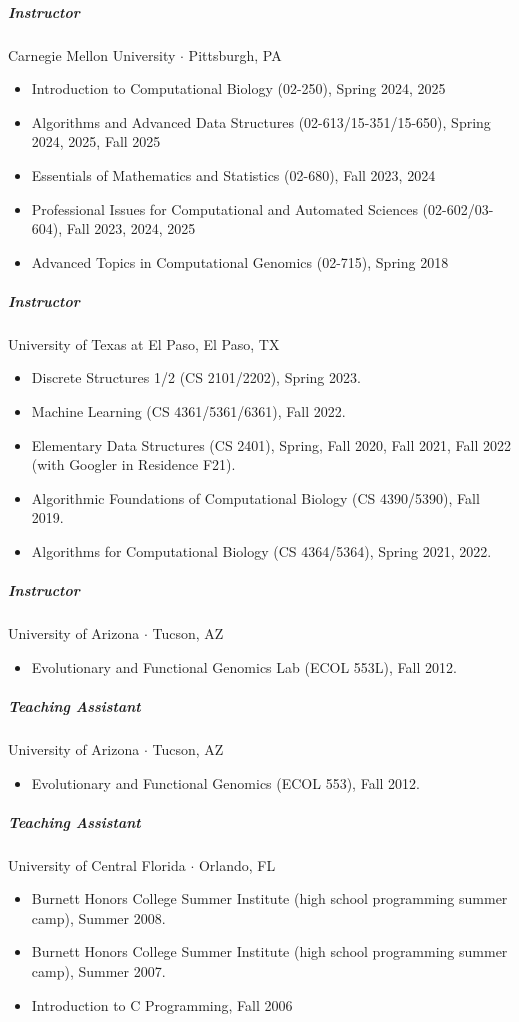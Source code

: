 \documentclass[10pt,letterpaper]{article}
\newcommand{\bigdot}{$\cdot$\xspace}
\begin{document}
\subparagraph{Instructor}  Carnegie Mellon University \bigdot Pittsburgh, PA
\begin{itemize}
    \item Introduction to Computational Biology (02-250), Spring 2024, 2025
    \item Algorithms and Advanced Data Structures (02-613/15-351/15-650), Spring 2024\footnotemark[1], 2025, Fall 2025
    \item Essentials of Mathematics and Statistics (02-680), Fall 2023\footnotemark[1], 2024
    \item Professional Issues for Computational and Automated Sciences (02-602/03-604), Fall 2023\footnotemark[1], 2024\footnotemark[1], 2025\footnotemark[1]
    \item Advanced Topics in Computational Genomics (02-715), Spring 2018\footnotemark[1]
 \end{itemize}

\subparagraph{Instructor}  University of Texas at El Paso, El Paso, TX
\begin{itemize}
	\item Discrete Structures 1/2 (CS 2101/2202), Spring 2023.
	\item Machine Learning (CS 4361/5361/6361), Fall 2022.
	\item Elementary Data Structures (CS 2401), Spring, Fall 2020, Fall 2021, Fall 2022 (with Googler in Residence F21).
	\item Algorithmic Foundations of Computational Biology (CS 4390/5390), Fall 2019.
	\item Algorithms for Computational Biology (CS 4364/5364), Spring 2021, 2022.
\end{itemize}


\subparagraph{Instructor} University of Arizona \bigdot Tucson, AZ
\begin{itemize}
    \item Evolutionary and Functional Genomics Lab (ECOL 553L), Fall 2012.
\end{itemize}

\subparagraph{Teaching Assistant}
University of Arizona \bigdot Tucson, AZ
\begin{itemize}
    \item Evolutionary and Functional Genomics (ECOL 553), Fall 2012.
\end{itemize}

\subparagraph{Teaching Assistant}
University of Central Florida \bigdot Orlando, FL
\begin{itemize}
    \item Burnett Honors College Summer Institute (high school programming summer camp), Summer 2008.
    \item Burnett Honors College Summer Institute (high school programming summer camp), Summer 2007.
    \item Introduction to C Programming, Fall 2006
\end{itemize}
\end{document}
